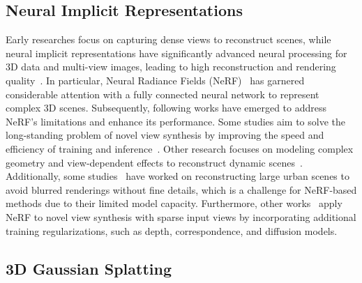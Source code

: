 
\subsection{Neural Implicit Representations}

Early researches focus on capturing dense views to reconstruct scenes, while neural implicit representations have significantly advanced neural processing for 3D data and multi-view images, leading to high reconstruction and rendering quality~\cite{OccNet2019CVPR, DeepSDF2019CVPR, DGA2020NIPS, SRN2019NIPS}. 
In particular, Neural Radiance Fields (NeRF)~\cite{NeRF2021ACM} has garnered considerable attention with a fully connected neural network to represent complex 3D scenes. 
Subsequently, following works have emerged to address NeRF's limitations and enhance its performance. 
Some studies aim to solve the long-standing problem of novel view synthesis by improving the speed and efficiency of training and inference~\cite{EfficientNeRF2022CVPR, FastNeRF2021ICCV,InstantNGP2022TOG, KiloNeRF2021ICCV, NSVF2020NIPS,PlenOctree2021CVPR, Plenoxels2022CVPR}. 
Other research focuses on modeling complex geometry and view-dependent effects to reconstruct dynamic scenes~\cite{du2021neural,li2021neural,pumarola2021d,tretschk2021non,xian2021space,ENeRF2022SIGGRAPH,Fourierplenoctree2022CVPR,tian2023mononerf,li2023dynibar,SUDS2023CVPR}. 
Additionally, some studies~\cite{MegaNeRF2022CVPR, BlockNeRF2022CVPR, GridNeRF2023CVPR, BungeeNeRF2022ECCV} have worked on reconstructing large urban scenes to avoid blurred renderings without fine details, which is a challenge for NeRF-based methods due to their limited model capacity. 
Furthermore, other works~\cite{niemeyer2022regnerf,truong2023sparf,wynn2023diffusionerf,xu2023murf} apply NeRF to novel view synthesis with sparse input views by incorporating additional training regularizations, such as depth, correspondence, and diffusion models.
    
\subsection{3D Gaussian Splatting}

